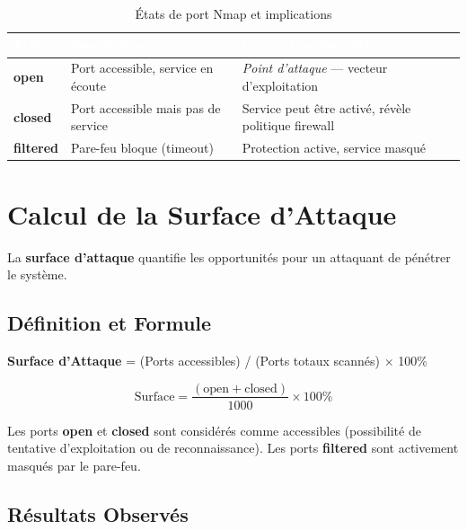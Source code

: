 \documentclass[12pt,a4paper,openany]{report}
\newcommand{\warningsymbol}{\ding{55}}  %
\begin{document}
\begin{table}[H]
	\centering
	\renewcommand{\arraystretch}{1.8}
	\setlength{\tabcolsep}{10pt}
	\setlength{\arrayrulewidth}{0.8pt}
	\begin{tabularx}{\textwidth}{|>{\bfseries}p{2.2cm}|p{4.5cm}|X|}
		\arrayrulecolor{tableborder}
		\hline
		\rowcolor{tableheadbg}
		\textcolor{white}{\textbf{État}}          &
		\textcolor{white}{\textbf{Signification}} &
		\textcolor{white}{\textbf{Implication Sécurité}} \\
		\hline
		\rowcolor{tablerowalt}
		open     & Port accessible, service en écoute  & \textcolor{success}{\checkmark} \textit{Point d'attaque} — vecteur d'exploitation \\
		\hline
		closed   & Port accessible mais pas de service & \textcolor{warning}{\warningsymbol} Service peut être activé, révèle politique firewall \\
		\hline
		\rowcolor{tablerowalt}
		filtered & Pare-feu bloque (timeout)           & \textcolor{success}{\bullet} Protection active, service masqué \\
		\hline
	\end{tabularx}
	\caption{États de port Nmap et implications}
	\label{tab:nmap-states}
\end{table}

\section{Calcul de la Surface d'Attaque}

La \textbf{surface d'attaque} quantifie les opportunités pour un attaquant de pénétrer le système.

\subsection{Définition et Formule}

\textbf{Surface d'Attaque} = (Ports accessibles) / (Ports totaux scannés) × 100\%

\begin{equation}
	\text{Surface} = \frac{(\text{open} + \text{closed})}{1000} \times 100\%
\end{equation}

Les ports \textbf{open} et \textbf{closed} sont considérés comme accessibles (possibilité de tentative d'exploitation ou de reconnaissance). Les ports \textbf{filtered} sont activement masqués par le pare-feu.

\subsection{Résultats Observés}
\end{document}

